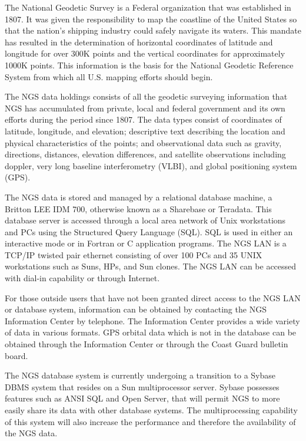 \medskip
\large
{}
\normalsize
\medskip

	The National Geodetic Survey is a Federal organization that was 
established in 1807.  It was given the responsibility to map the coastline 
of the United States so that the nation's shipping industry could safely 
navigate its waters.  This mandate has resulted in the determination of 
horizontal coordinates of latitude and longitude for over 300K points and 
the vertical coordinates for approximately 1000K points.  This 
information is the basis for the National Geodetic Reference System from 
which all U.S. mapping efforts should begin.

	The NGS data holdings consists of all the geodetic surveying 
information that NGS has accumulated from private, local and federal 
government and its own efforts during the period since 1807.  The data 
types consist of coordinates of latitude, longitude, and elevation; 
descriptive text describing the location and physical characteristics of 
the points; and observational data such as gravity, directions, distances, 
elevation differences, and satellite observations including doppler, very 
long baseline interferometry (VLBI), and global positioning system (GPS).

	The NGS data is stored and managed by a relational database 
machine, a Britton LEE IDM 700, otherwise known as a Sharebase or 
Teradata.  This database server is accessed through a local area network 
of Unix workstations and PCs using the Structured Query Language (SQL).  
SQL is used in either an interactive mode or in Fortran or C application 
programs.  The NGS LAN is a TCP/IP twisted pair ethernet consisting of 
over 100 PCs and 35 UNIX workstations such as Suns, HPs, and Sun clones.  
The NGS LAN can be accessed with dial-in capability or through Internet.

	For those outside users that have not been granted direct access to 
the NGS LAN or database system, information can be obtained by 
contacting the NGS Information Center by telephone.  The Information 
Center provides a wide variety of data in various formats.  GPS orbital 
data which is not in the database can be obtained through the Information 
Center or through the Coast Guard bulletin board.

	The NGS database system is currently undergoing a transition to a 
Sybase DBMS system that resides on a Sun multiprocessor server.  Sybase 
possesses features such as ANSI SQL and Open Server, that will permit 
NGS to more easily share its data with other database systems.  The 
multiprocessing capability of this system will also increase the 
performance and therefore the availability of the NGS data.

